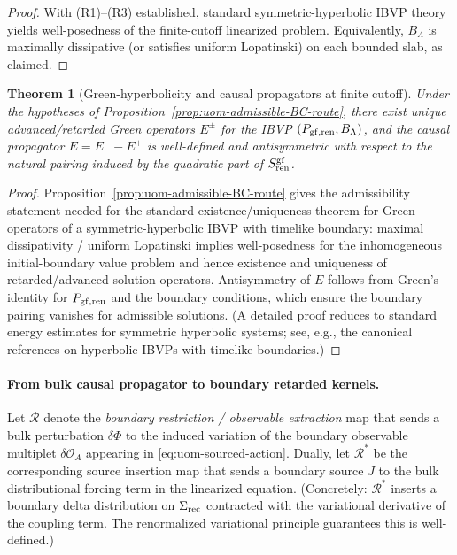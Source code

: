 \documentclass[10pt]{article}
\theoremstyle{definition}
\theoremstyle{plain}
\newtheorem{theorem}{Theorem}[section]
\begin{document}
\begin{proof}
With \textnormal{(R1)}--\textnormal{(R3)} established, standard symmetric-hyperbolic IBVP theory yields well-posedness of the finite-cutoff
linearized problem.  Equivalently, $B_\Lambda$ is maximally dissipative (or satisfies uniform Lopatinski) on each bounded slab, as claimed.
\end{proof}

\begin{theorem}[Green-hyperbolicity and causal propagators at finite cutoff]
\label{thm:uom-P2-green}
Under the hypotheses of Proposition~\ref{prop:uom-admissible-BC-route}, there exist unique advanced/retarded Green operators $E^\pm$ for the IBVP
$(P_{\rm gf,ren},B_\Lambda)$, and the causal propagator $E=E^- - E^+$ is well-defined and antisymmetric with respect to the natural
pairing induced by the quadratic part of $S_{\rm ren}^{\rm gf}$.
\end{theorem}

\begin{proof}
Proposition~\ref{prop:uom-admissible-BC-route} gives the admissibility statement needed for the standard existence/uniqueness theorem for Green operators
of a symmetric-hyperbolic IBVP with timelike boundary: maximal dissipativity / uniform Lopatinski implies well-posedness for the inhomogeneous
initial-boundary value problem and hence existence and uniqueness of retarded/advanced solution operators.
Antisymmetry of $E$ follows from Green's identity for $P_{\rm gf,ren}$ and the boundary conditions, which ensure the boundary pairing
vanishes for admissible solutions.  (A detailed proof reduces to standard energy estimates for symmetric hyperbolic systems; see, e.g.,
the canonical references on hyperbolic IBVPs with timelike boundaries.)
\end{proof}

\paragraph{From bulk causal propagator to boundary retarded kernels.}
Let $\mathcal R$ denote the \emph{boundary restriction / observable extraction} map that sends a bulk perturbation $\delta\Phi$ to the induced
variation of the boundary observable multiplet $\delta\mathcal O_A$ appearing in \eqref{eq:uom-sourced-action}.  Dually, let $\mathcal R^\ast$
be the corresponding source insertion map that sends a boundary source $J$ to the bulk distributional forcing term in the linearized equation.
(Concretely: $\mathcal R^\ast$ inserts a boundary delta distribution on $\Sigma_{\rm rec}$ contracted with the variational derivative of the
coupling term.  The renormalized variational principle guarantees this is well-defined.)
\end{document}
